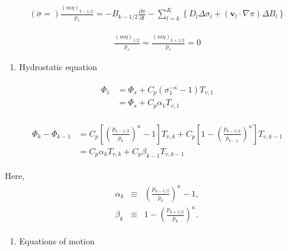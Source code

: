 \begin{eqnarray}
(\dot{\sigma}=) \frac{(m \dot{\eta})_{k-1 / 2}}{p_{s}}=-B_{k-1 / 2} \frac{\partial \pi}{\partial t}-\sum_{l=k}^{K}\left\{D_{l} \Delta \sigma_{l}+\left(\mathbf{v}_{l} \cdot \nabla \pi\right) \Delta B_{l}\right\}
\end{eqnarray}

\begin{eqnarray}
  \frac{(m\dot{\eta})_{1/2}}{p_s} = \frac{(m\dot{\eta})_{k+1/2}}{p_s} = 0  \end{eqnarray}

\begin{enumerate}
\def\labelenumi{\arabic{enumi}.}
\tightlist
\item
  Hydrostatic equation
\end{enumerate}

\begin{eqnarray}
\begin{aligned}
\Phi_{1} &=\Phi_{s}+C_{p}\left(\sigma_{1}^{-\kappa}-1\right) T_{v, 1} \\
&=\Phi_{s}+C_{p} \alpha_{1} T_{v, 1}
\end{aligned}
\end{eqnarray}

\begin{eqnarray}
\begin{aligned}
\Phi_{k}-\Phi_{k-1} &=C_{p}\left[\left(\frac{p_{k-1 / 2}}{p_{k}}\right)^{\kappa}-1\right] T_{v, k}+C_{p}\left[1-\left(\frac{p_{k-1 / 2}}{p_{k-1}}\right)^{\kappa}\right] T_{v, k-1} \\
&=C_{p} \alpha_{k} T_{v, k}+C_{p} \beta_{k-1} T_{v, k-1}
\end{aligned}
\end{eqnarray}

Here, \begin{eqnarray}
\begin{aligned}
 \alpha_k &\equiv & \left( \frac{ p_{k-1/2} }
                               { p_k } \right)^{\kappa} -1, \\
 \beta_k &\equiv &  1- \left( \frac{ p_{k+1/2} }
                               { p_k } \right)^{\kappa} . \end{aligned}\end{eqnarray}

\begin{enumerate}
\def\labelenumi{\arabic{enumi}.}
\tightlist
\item
  Equations of motion
\end{enumerate}

